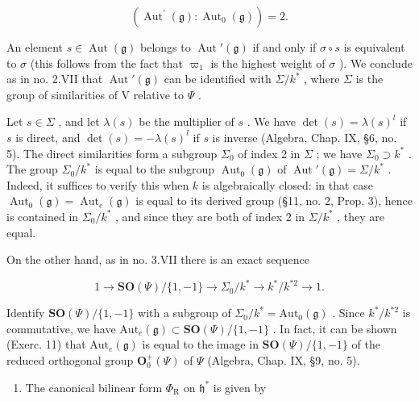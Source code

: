 \[
\left(\operatorname{Aut} ^ {\prime} (\mathfrak {g}): \operatorname{Aut} _ {0} (\mathfrak {g})\right) = 2.
\]

An element \(s \in \operatorname{Aut}(\mathfrak{g})\) belongs to \(\operatorname{Aut}'(\mathfrak{g})\) if and only if \(\sigma \circ s\) is equivalent to \(\sigma\) (this follows from the fact that \(\varpi_{1}\) is the highest weight of \(\sigma\) ). We conclude as in no. 2.VII that \(\operatorname{Aut}'(\mathfrak{g})\) can be identified with \(\Sigma/k^{*}\) , where \(\Sigma\) is the group of similarities of V relative to \(\Psi\) .

Let \(s \in \Sigma\) , and let \(\lambda(s)\) be the multiplier of \(s\) . We have \(\det(s) = \lambda(s)^l\) if \(s\) is direct, and \(\det(s) = -\lambda(s)^l\) if \(s\) is inverse (Algebra, Chap. IX, §6, no. 5). The direct similarities form a subgroup \(\Sigma_0\) of index 2 in \(\Sigma\) ; we have \(\Sigma_0 \supset k^*\) . The group \(\Sigma_0 / k^*\) is equal to the subgroup \(\operatorname{Aut}_0(\mathfrak{g})\) of \(\operatorname{Aut}'(\mathfrak{g}) = \Sigma / k^*\) . Indeed, it suffices to verify this when \(k\) is algebraically closed: in that case \(\operatorname{Aut}_0(\mathfrak{g}) = \operatorname{Aut}_e(\mathfrak{g})\) is equal to its derived group (§11, no. 2, Prop. 3), hence is contained in \(\Sigma_0 / k^*\) , and since they are both of index 2 in \(\Sigma / k^*\) , they are equal.

On the other hand, as in no. 3.VII there is an exact sequence

\[
1 \longrightarrow \mathbf {S O} (\varPsi) / \{1, - 1 \} \longrightarrow \varSigma_ {0} / k ^ {*} \longrightarrow k ^ {*} / k ^ {* 2} \longrightarrow 1.
\]

Identify \(\mathbf{SO}(\varPsi)/\{1,-1\}\) with a subgroup of \(\Sigma_{0}/k^{*}=\mathrm{Aut}_{0}(\mathfrak{g})\) . Since \(k^{*}/k^{*2}\) is commutative, we have \(\mathrm{Aut}_{e}(\mathfrak{g})\subset\mathbf{SO}(\varPsi)/\{1,-1\}\) . In fact, it can be shown (Exerc. 11) that \(\mathrm{Aut}_{e}(\mathfrak{g})\) is equal to the image in \(\mathbf{SO}(\varPsi)/\{1,-1\}\) of the reduced orthogonal group \(\mathbf{O}_{0}^{+}(\varPsi)\) of \(\varPsi\) (Algebra, Chap. IX, §9, no. 5).

\begin{enumerate}
\def\labelenumi{(\Roman{enumi})}
\setcounter{enumi}{7}
\tightlist
\item
  The canonical bilinear form \(\varPhi_{\mathrm{R}}\) on \(\mathfrak{h}^*\) is given by
\end{enumerate}

